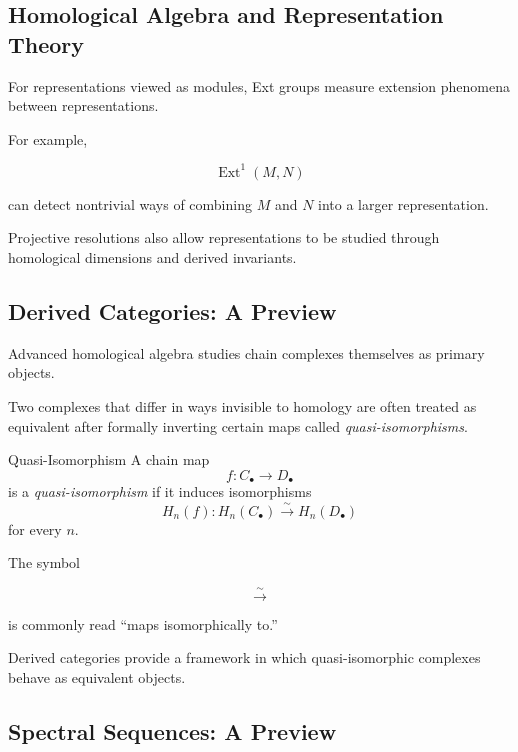 \subsection{Homological Algebra and Representation Theory}
\label{subsec:homological-representation-theory}

For representations viewed as modules, Ext groups measure extension
phenomena between representations.

For example,

\[ \operatorname{Ext}^1(M,N) \]

can detect nontrivial ways of combining \(M\) and \(N\) into a larger
representation.

Projective resolutions also allow representations to be studied through
homological dimensions and derived invariants.

\subsection{Derived Categories: A Preview}
\label{subsec:derived-categories-preview}

Advanced homological algebra studies chain complexes themselves as primary
objects.

Two complexes that differ in ways invisible to homology are often treated as
equivalent after formally inverting certain maps called
\emph{quasi-isomorphisms}.

\begin{definitionbox}{Quasi-Isomorphism}
A chain map
\[ f:C_\bullet\to D_\bullet \]
is a \emph{quasi-isomorphism} if it induces isomorphisms
\[ H_n(f):H_n(C_\bullet)\xrightarrow{\sim}H_n(D_\bullet) \]
for every \(n\).
\end{definitionbox}

The symbol

\[ \xrightarrow{\sim} \]

is commonly read ``maps isomorphically to.''

Derived categories provide a framework in which quasi-isomorphic complexes
behave as equivalent objects.

\subsection{Spectral Sequences: A Preview}
\label{subsec:spectral-sequences-preview}

